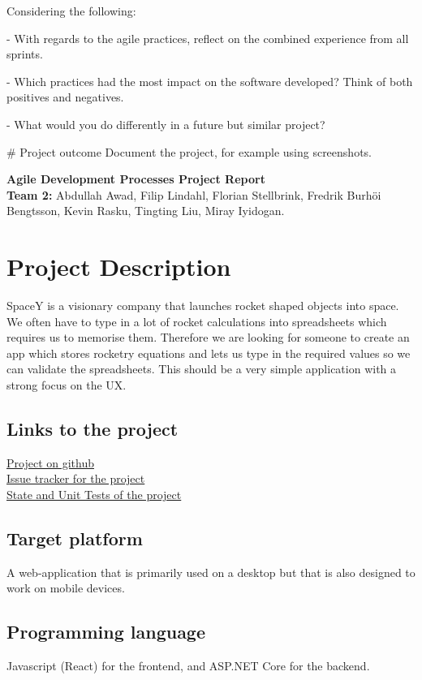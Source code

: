 \documentclass[14]{article}
\begin{document}
Considering the following:

- With regards to the agile practices, reflect on the combined experience from all sprints.

- Which practices had the most impact on the software developed?
  Think of both positives and negatives.

- What would you do differently in a future but similar project?


# Project outcome
Document the project, for example using screenshots.
\fi

\noindent 
\textbf{Agile Development Processes Project Report} \\
\textbf{Team 2:} 
Abdullah Awad,
Filip Lindahl,
Florian Stellbrink,
Fredrik Burhöi Bengtsson, 
Kevin Rasku,
Tingting Liu,
Miray Iyidogan. \\ 


\section{Project Description}
SpaceY is a visionary company that launches rocket shaped objects into space. We often have to type in a lot of rocket calculations into spreadsheets which requires us to memorise them. Therefore we are looking for someone to create an app which stores rocketry equations and lets us type in the required values so we can validate the spreadsheets. This should be a very simple application with a strong focus on the UX.

\subsection{Links to the project}
\href{https://github.com/Owlinated/adp_project}{Project on github} \\
\href{https://github.com/Owlinated/adp_project/projects/1}{Issue tracker for the project} \\
\href{https://adp-spacey.herokuapp.com/}{State and Unit Tests of the project}

\subsection{Target platform}
A web-application that is primarily used on a desktop but that is also designed to work on mobile devices.

\subsection{Programming language}
Javascript (React) for the frontend, and ASP.NET Core for the backend.
\end{document}
